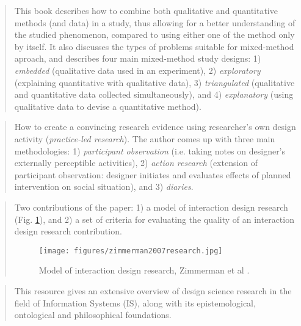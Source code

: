 		\begin{quote}
		\small
		This book describes how to combine both qualitative and quantitative methods 
		(and data) in a study,
		thus allowing for a better understanding of the studied phenomenon, compared to using
		either one of the method only by itself.
		It also discusses the types of problems suitable for mixed-method aproach, and 
		describes four main mixed-method study designs:
		1) {\em embedded} (qualitative data used in an experiment),
		2) {\em exploratory} (explaining quantitative with qualitative data),
		3) {\em triangulated} (qualitative and quantitative data collected simultaneously), and
		4) {\em explanatory} (using qualitative data to devise a quantitative method). 
		\end{quote}

		\begin{quote}
		\small
		How to create a convincing research evidence using researcher's own
		design activity ({\em practice-led research}). The author comes up with
		three main methodologies:
		1) {\em participant observation} (i.e. taking notes on designer's externally perceptible activities),
		2) {\em action research} (extension of participant observation: designer initiates and evaluates
		effects of planned intervention on social situation), and
		3) {\em diaries}.
		\end{quote}

		\begin{quote}
		\small
		Two contributions of the paper:
		1) a model of interaction design research (Fig. \ref{fig:zimmerman2007research}), and
		2) a set of criteria for evaluating the quality of an interaction design research contribution.
		\begin{figure}[htb]
		\begin{center}
		\texttt{[image: figures/zimmerman2007research.jpg]}
		\caption{Model of interaction design research, Zimmerman et al \cite{zimmerman2007research}.}
		\label{fig:zimmerman2007research}
		\end{center}
		\end{figure}		
		\end{quote}

		\begin{quote}
		\small
		This resource gives an extensive overview of design science research in the field
		of Information Systems (IS), along
		with its epistemological, ontological and philosophical foundations.
		\end{quote}

